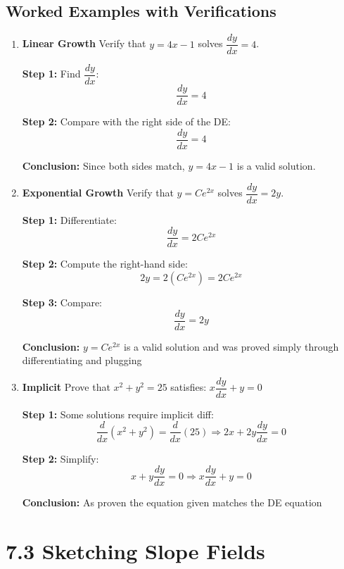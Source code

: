 \documentclass{article}
\begin{document}
\subsection*{Worked Examples with Verifications}

\begin{enumerate}
  \item \textbf{Linear Growth}  
  Verify that \(y = 4x - 1\) solves \(\dfrac{dy}{dx} = 4\).

  \textbf{Step 1:} Find \(\dfrac{dy}{dx}\):
  \[
  \frac{dy}{dx} = 4
  \]

  \textbf{Step 2:} Compare with the right side of the DE:
  \[
  \frac{dy}{dx} = 4
  \]

  \textbf{Conclusion:} Since both sides match, \(y = 4x - 1\) is a valid solution.

  \bigskip

  \item \textbf{Exponential Growth}  
  Verify that \(y = Ce^{2x}\) solves \(\dfrac{dy}{dx} = 2y\).

  \textbf{Step 1:} Differentiate:
  \[
  \frac{dy}{dx} = 2Ce^{2x}
  \]

  \textbf{Step 2:} Compute the right-hand side:
  \[
  2y = 2(Ce^{2x}) = 2Ce^{2x}
  \]

  \textbf{Step 3:} Compare:
  \[
  \frac{dy}{dx} = 2y 
  \]

  \textbf{Conclusion:} \(y = Ce^{2x}\) is a valid solution and was proved simply through differentiating and plugging

  \bigskip

  \item \textbf{Implicit}  
  Prove that \(x^2 + y^2 = 25\) satisfies: \(x\dfrac{dy}{dx} + y = 0\)

  \textbf{Step 1:} Some solutions require implicit diff:
  \[
  \frac{d}{dx}(x^2 + y^2) = \frac{d}{dx}(25) \Rightarrow 2x + 2y\frac{dy}{dx} = 0
  \]

  \textbf{Step 2:} Simplify:
  \[
  x + y\frac{dy}{dx} = 0 \Rightarrow x\frac{dy}{dx} + y = 0
  \]

  \textbf{Conclusion:} As proven the equation given matches the DE equation
\end{enumerate}




\newpage
\section{7.3 Sketching Slope Fields}
\end{document}
